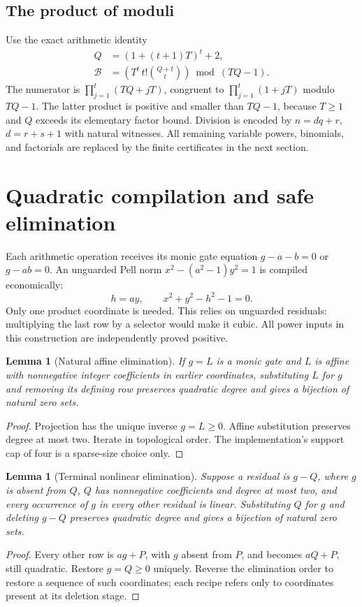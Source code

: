 \documentclass[11pt,letterpaper]{article}
\newtheorem{lemma}[theorem]{Lemma}
\theoremstyle{definition}\newtheorem{definition}[theorem]{Definition}
\theoremstyle{remark}\newtheorem{remark}[theorem]{Remark}
\begin{document}
\subsection{The product of moduli}

Use the exact arithmetic identity
\begin{align*}
 Q&=(1+(t+1)T)^t+2,\\
 \mathcal B&=\left(T^t\,t!\binom{Q+t}{t}\right)\bmod(TQ-1).
\end{align*}
The numerator is $\prod_{j=1}^{t}(TQ+jT)$, congruent to
$\prod_{j=1}^{t}(1+jT)$ modulo $TQ-1$.
The latter product is positive and smaller than $TQ-1$, because
$T\ge1$ and $Q$ exceeds its elementary factor bound.
Division is encoded by $n=dq+r$, $d=r+s+1$ with natural witnesses.
All remaining variable powers, binomials, and factorials are replaced
by the finite certificates in the next section.



\section{Quadratic compilation and safe elimination}\label{sec:compile}

Each arithmetic operation receives its monic gate equation
$g-a-b=0$ or $g-ab=0$. An unguarded Pell norm
$x^2-(a^2-1)y^2=1$ is compiled economically:
\[
 h=ay,\qquad x^2+y^2-h^2-1=0.
\]
Only one product coordinate is needed. This relies on unguarded
residuals: multiplying the last row by a selector would make it cubic.
All power inputs in this construction are independently proved positive.

\begin{lemma}[Natural affine elimination]\label{lem:affine}
If $g=L$ is a monic gate and $L$ is affine with nonnegative integer
coefficients in earlier coordinates, substituting $L$ for $g$ and
removing its defining row preserves quadratic degree and gives a
bijection of natural zero sets.
\end{lemma}
\begin{proof}
Projection has the unique inverse $g=L\ge0$. Affine substitution
preserves degree at most two. Iterate in topological order.
The implementation's support cap of four is a sparse-size choice only.
\end{proof}

\begin{lemma}[Terminal nonlinear elimination]\label{lem:terminal}
Suppose a residual is $g-Q$, where $g$ is absent from $Q$, $Q$ has
nonnegative coefficients and degree at most two, and every occurrence
of $g$ in every other residual is linear. Substituting $Q$ for $g$ and
deleting $g-Q$ preserves quadratic degree and gives a bijection of
natural zero sets.
\end{lemma}
\begin{proof}
Every other row is $a g+P$, with $g$ absent from $P$, and becomes
$aQ+P$, still quadratic. Restore $g=Q\ge0$ uniquely.
Reverse the elimination order to restore a sequence of such coordinates;
each recipe refers only to coordinates present at its deletion stage.
\end{proof}
\end{document}
